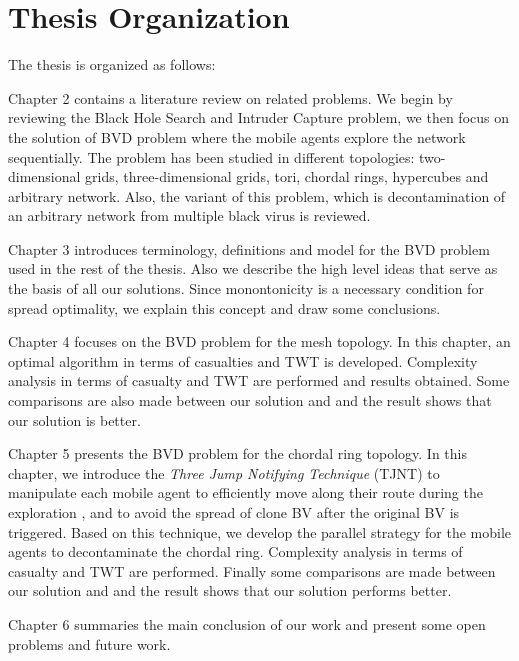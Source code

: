 
\section{Thesis Organization} 

The thesis is organized as follows:

Chapter 2 contains a literature review on related problems. We begin by reviewing the Black Hole Search and Intruder Capture problem, we then focus on the solution of BVD problem where the mobile agents explore the network sequentially. The problem has been studied in different topologies: two-dimensional grids, three-dimensional grids, tori, chordal rings, hypercubes and arbitrary network. Also, the variant of this problem, which is decontamination of an arbitrary network from multiple black virus is   reviewed. 

Chapter 3 introduces terminology, definitions and model for the BVD problem used in the rest of the thesis. Also we describe the high level ideas that serve as the basis of all our solutions. Since monontonicity is a necessary condition for spread optimality, we explain this concept  and draw some  conclusions.

Chapter 4 focuses on the BVD problem for the mesh topology. In this chapter, an optimal algorithm in terms of casualties and TWT is developed. Complexity analysis in terms of casualty and TWT are performed and results obtained. Some comparisons  are also made between our solution and \cite{cai} and the result shows that our solution is better.

Chapter 5 presents the BVD problem for the chordal ring topology. In this chapter, we introduce the {\em Three Jump Notifying Technique} (TJNT) to manipulate each mobile agent to efficiently move along their route during the exploration ,   and to avoid  the spread of clone BV after the original BV is triggered. Based on this technique, we develop the parallel strategy for the mobile agents to decontaminate the chordal ring. Complexity analysis in terms of casualty and TWT are performed. Finally some comparisons are made between our solution and \cite{alotaibi} and the result shows that our solution performs better.

Chapter 6 summaries the main conclusion of our work and present some open problems and future work.
  



